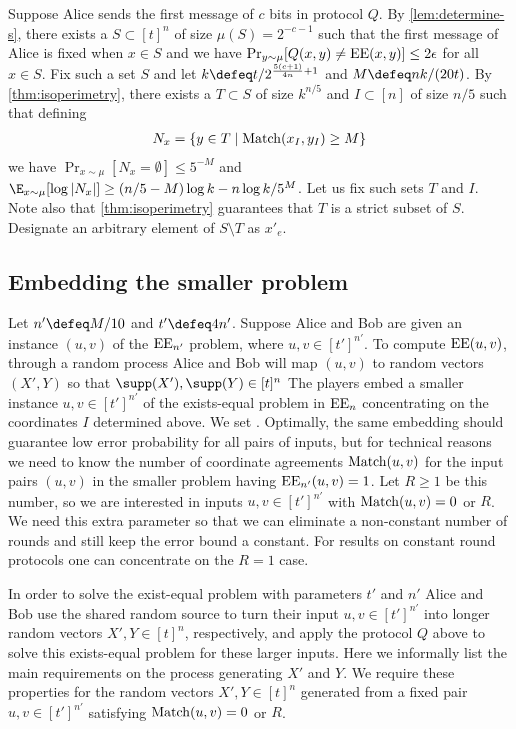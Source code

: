 Suppose Alice sends the first message of $c$ bits in protocol $Q$. By
\autoref{lem:determine-s}, there exists a $S\subset [t]^n$ of
size $\mu(S)=2^{-c-1}$ such that the first message of Alice is
fixed when $x\in S$ and we have $\Pr_{y\sim
\mu}[Q(x,y)\neq\operatorname{EE}(x,y)]\leq 2\epsilon$ for all $x\in S$. Fix
such a set $S$ and let $k\defeq t/2^{\frac{5(c+1)}{4n} + 1}$ and
$M \defeq nk/(20t)$. By \autoref{thm:isoperimetry}, there exists
a $T\subset S$ of size $k^{n/5}$ and $I\subset[n]$ of size $n/5$
such that defining
\begin{align*}
N_x=\{y\in T\mid\operatorname{Match}(x_I,y_I)\ge M\}
\end{align*}
we have $\Pr_{x\sim\mu}[N_x=\emptyset] \le 5^{-M}$ and
$\E_{x\sim \mu}[\log|N_x|]\geq (n/5-M)\log k - n\log k /5^M$.
Let us fix such sets $T$ and $I$. Note also that
\autoref{thm:isoperimetry} guarantees that $T$ is a strict
subset of $S$. Designate an arbitrary element of $S\setminus T$
as $x'_e$.

\subsection{Embedding the smaller problem}
\label{sec:embed}
Let $n'\defeq M/10$ and $t'\defeq4n'$. Suppose Alice and Bob
are given an instance $(u,v)$ of the $\operatorname{EE}_{n'}$ problem,
where $u,v\in[t']^{n'}$. To compute $\operatorname{EE}(u,v)$, 
through a random process Alice and Bob will map $(u,v)$ to
random vectors $(X', Y)$ so that $\supp(X'),\supp(Y)\in[t]^n$
The players embed a smaller instance $u,v\in[t']^{n'}$ of the
exists-equal problem in $\operatorname{EE}_n$ concentrating on the coordinates
$I$ determined above. We set .
Optimally, the same embedding should guarantee low error
probability for all pairs of inputs, but for technical reasons
we need to know the number of coordinate agreements
$\operatorname{Match}(u,v)$ for the input pairs $(u,v)$ in the smaller problem
having $\operatorname{EE}_{n'}(u,v)=1$. Let $R\ge1$ be this number, so we are
interested in inputs $u,v\in[t']^{n'}$ with $\operatorname{Match}(u,v)=0$ or
$R$. We need this extra parameter so that we can eliminate a
non-constant number of rounds and still keep the error bound a
constant. For results on constant round protocols one can
concentrate on the $R=1$ case.

In order to solve the exist-equal problem with parameters $t'$
and $n'$ Alice and Bob use the shared random source to turn their
input $u,v\in[t']^{n'}$ into longer random vectors
$X',Y\in[t]^n$, respectively, and apply the protocol $Q$ above
to solve this exists-equal problem for these larger inputs. Here
we informally list the main requirements on the process
generating $X'$ and $Y$. We require these properties for the
random vectors $X',Y\in[t]^n$ generated from a fixed pair
$u,v\in[t']^{n'}$ satisfying $\operatorname{Match}(u,v)=0$ or $R$.

